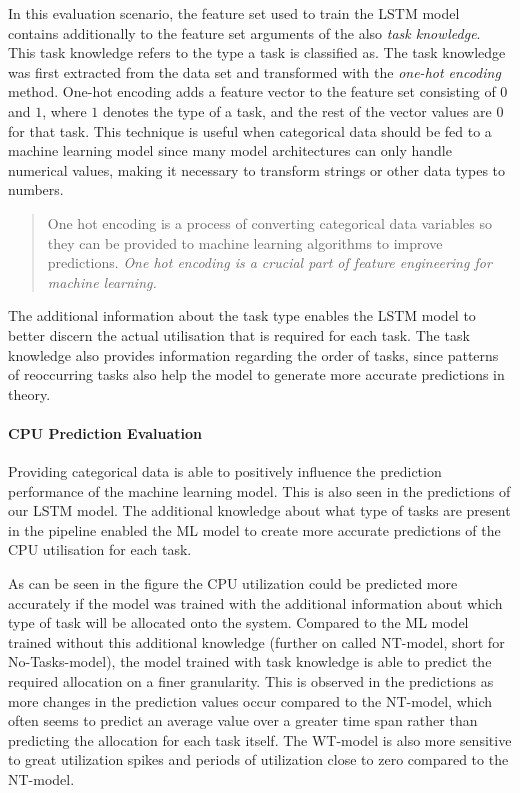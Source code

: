     In this evaluation scenario, the feature set used to train the LSTM model contains additionally to the feature set arguments of the  also \emph{task knowledge}. This task knowledge refers to the type a task is classified as. The task knowledge was first extracted from the data set and transformed with the \emph{one-hot encoding} \cite{husseinEnhancementPerformanceRandom2021} method. One-hot encoding adds a feature vector to the feature set consisting of $0$ and $1$, where $1$ denotes the type of a task, and the rest of the vector values are $0$ for that task. This technique is useful when categorical data should be fed to a machine learning model since many model architectures can only handle numerical values, making it necessary to transform strings or other data types to numbers.
    \begin{quote}
      One hot encoding is a process of converting categorical data variables so they can be provided to machine learning algorithms to improve predictions. \emph{One hot encoding is a crucial part of feature engineering for machine learning.} \cite{fawcettDataScienceMinutes}
    \end{quote}
    The additional information about the task type enables the LSTM model to better discern the actual utilisation that is required for each task.
    The task knowledge also provides information regarding the order of tasks, since patterns of reoccurring tasks also help the model to generate more accurate predictions in theory.

    \paragraph{CPU Prediction Evaluation}
    \label{par:cpu-prediction-evaluation-task-knowledge}

      Providing categorical data is able to positively influence the prediction performance of the machine learning model. This is also seen in the predictions of our LSTM model. The additional knowledge about what type of tasks are present in the pipeline enabled the ML model to create more accurate predictions of the CPU utilisation for each task.

      As can be seen in the figure 
      the CPU utilization could be predicted more accurately if the model was trained with the additional information about which type of task will be allocated onto the system.
      Compared to the ML model trained without this additional knowledge (further on called NT-model, short for No-Tasks-model), the model trained with task knowledge is able to predict the required allocation on a finer granularity.
      This is observed in the predictions as more changes in the prediction values occur compared to the NT-model, which often seems to predict an average value over a greater time span rather than predicting the allocation for each task itself.
      The WT-model is also more sensitive to great utilization spikes and periods of utilization close to zero compared to the NT-model.

